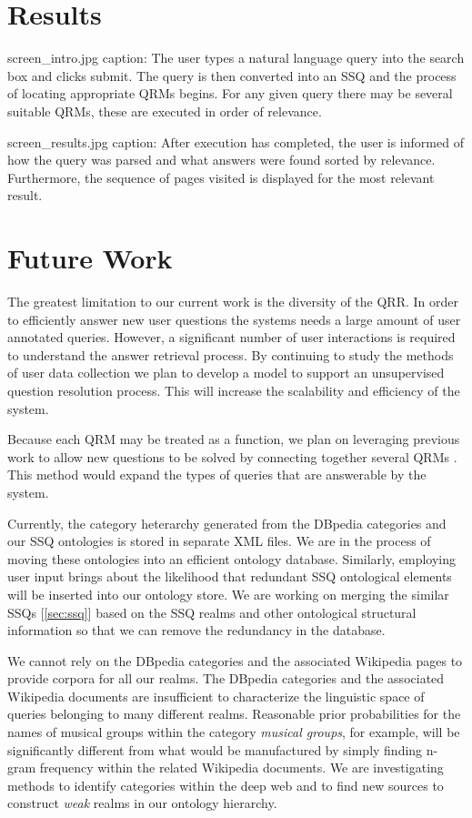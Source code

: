 \section{Results}

screen_intro.jpg caption:
The user types a natural language query into the search box and clicks submit. The query is then converted into an SSQ and the process of locating appropriate QRMs begins. For any given query there may be several suitable QRMs, these are executed in order of relevance. 

screen_results.jpg caption:
After execution has completed, the user is informed of how the query was parsed and what answers were found sorted by relevance. Furthermore, the sequence of pages visited is displayed for the most relevant result. 


\section{Future Work}

The greatest limitation to our current work is the diversity of the
QRR.  In order to efficiently answer new user questions the systems
needs a large amount of user annotated queries.  However, a
significant number of user interactions is required to understand the
answer retrieval process.  By continuing to study the methods of user
data collection we plan to develop a model to support an unsupervised
question resolution process.  This will increase the scalability and
efficiency of the system.

Because each QRM may be treated as a function, we plan on leveraging
previous work to allow new questions to be solved by connecting
together several QRMs \cite{morpheus1, transformscout}.  This method
would expand the types of queries that are answerable by the system.

Currently, the category heterarchy generated from the DBpedia
categories and our SSQ ontologies is stored in separate XML files. We
are in the process of moving these ontologies into an efficient
ontology database. Similarly, employing user input brings about the
likelihood that redundant SSQ ontological elements will be inserted
into our ontology store. We are working on merging the similar SSQs
[\ref{sec:ssq}] based on the SSQ realms and other ontological
structural information so that we can remove the redundancy in the
database.

We cannot rely on the DBpedia categories and the associated Wikipedia
pages to provide corpora for all our realms.  The DBpedia categories
and the associated Wikipedia documents are insufficient to
characterize the linguistic space of queries belonging to many
different realms.  Reasonable prior probabilities for the names of
musical groups within the category \emph{musical groups}, for example,
will be significantly different from what would be manufactured by
simply finding n-gram frequency within the related Wikipedia
documents. We are investigating methods to identify categories within
the deep web and to find new sources to construct \textit{weak} realms
in our ontology hierarchy.


